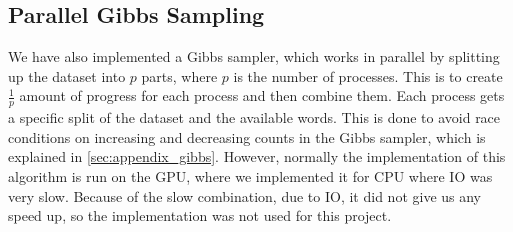 \subsection{Parallel Gibbs Sampling}\label{sec:appendix_para_gibbs}
We have also implemented a Gibbs sampler, which works in parallel by splitting up the dataset into $p$ parts, where $p$ is the number of processes.
This is to create $\frac{1}{p}$ amount of progress for each process and then combine them.
Each process gets a specific split of the dataset and the available words. 
This is done to avoid race conditions on increasing and decreasing counts in the Gibbs sampler, which is explained in \autoref{sec:appendix_gibbs}.
However, normally the implementation of this algorithm is run on the GPU, where we implemented it for CPU where IO was very slow.
Because of the slow combination, due to IO, it did not give us any speed up, so the implementation was not used for this project. 
